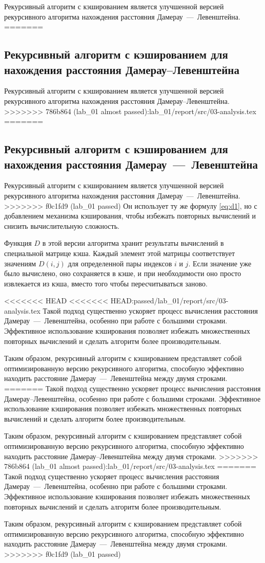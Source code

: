 Рекурсивный алгоритм с кэшированием является улучшенной версией рекурсивного алгоритма нахождения расстояния Дамерау~---~Левенштейна. 
=======
\subsection{Рекурсивный алгоритм с кэшированием для нахождения расстояния Дамерау--Левенштейна}

Рекурсивный алгоритм с кэшированием является улучшенной версией рекурсивного алгоритма нахождения расстояния Дамерау--Левенштейна. 
>>>>>>> 786b864 (lab_01 almost passed):lab_01/report/src/03-analysis.tex
=======
\subsection{Рекурсивный алгоритм с кэшированием для нахождения расстояния Дамерау~---~Левенштейна}

Рекурсивный алгоритм с кэшированием является улучшенной версией рекурсивного алгоритма нахождения расстояния Дамерау~---~Левенштейна. 
>>>>>>> f0c1fd9 (lab_01 passed)
Он использует ту же формулу \ref{eq:d1}, но с добавлением механизма кэширования, чтобы избежать повторных вычислений и снизить вычислительную сложность.

Функция $D$ в этой версии алгоритма хранит результаты вычислений в специальной матрице кэша. 
Каждый элемент этой матрицы соответствует значениям $D(i, j)$ для определенной пары индексов $i$ и $j$. 
Если значение уже было вычислено, оно сохраняется в кэше, и при необходимости оно просто извлекается из кэша, вместо того чтобы пересчитываться заново.

<<<<<<< HEAD
<<<<<<< HEAD:passed/lab_01/report/src/03-analysis.tex
Такой подход существенно ускоряет процесс вычисления расстояния Дамерау~---~Левенштейна, особенно при работе с большими строками.
Эффективное использование кэширования позволяет избежать множественных повторных вычислений и сделать алгоритм более производительным.

Таким образом, рекурсивный алгоритм с кэшированием представляет собой оптимизированную версию рекурсивного алгоритма, способную эффективно находить расстояние Дамерау~---~Левенштейна между двумя строками.
=======
Такой подход существенно ускоряет процесс вычисления расстояния Дамерау--Левенштейна, особенно при работе с большими строками.
Эффективное использование кэширования позволяет избежать множественных повторных вычислений и сделать алгоритм более производительным.

Таким образом, рекурсивный алгоритм с кэшированием представляет собой оптимизированную версию рекурсивного алгоритма, способную эффективно находить расстояние Дамерау--Левенштейна между двумя строками.
>>>>>>> 786b864 (lab_01 almost passed):lab_01/report/src/03-analysis.tex
=======
Такой подход существенно ускоряет процесс вычисления расстояния Дамерау~---~Левенштейна, особенно при работе с большими строками.
Эффективное использование кэширования позволяет избежать множественных повторных вычислений и сделать алгоритм более производительным.

Таким образом, рекурсивный алгоритм с кэшированием представляет собой оптимизированную версию рекурсивного алгоритма, способную эффективно находить расстояние Дамерау~---~Левенштейна между двумя строками.
>>>>>>> f0c1fd9 (lab_01 passed)

